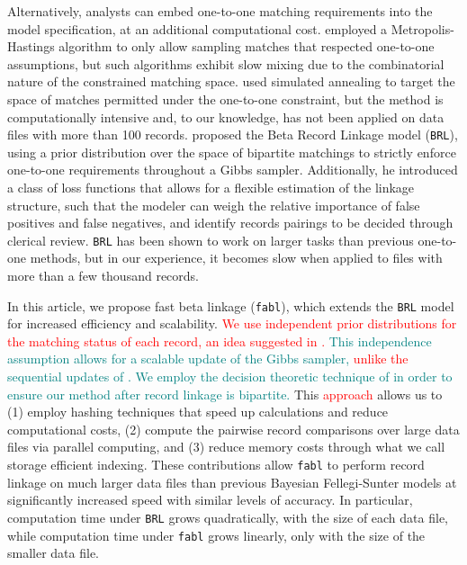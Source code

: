 \documentclass[ba]{imsart}
\begin{document}
Alternatively, analysts can embed one-to-one matching requirements into the model specification, at an additional computational cost. \cite{Larsen05} employed a Metropolis-Hastings algorithm to only allow sampling matches that respected one-to-one assumptions, but such algorithms exhibit slow mixing due to the combinatorial nature of the constrained matching space. \cite{fortunato_2010} used simulated annealing to target the space of matches permitted under the one-to-one constraint, but the method is computationally intensive and, to our knowledge, has not been applied on data files with more than 100 records. \cite{sadinle_bayesian_2017} proposed the Beta Record Linkage model (\texttt{BRL}), using a prior distribution over the space of bipartite matchings to strictly enforce one-to-one requirements throughout a Gibbs sampler. Additionally, he introduced a class of loss functions that allows for a flexible estimation of the linkage structure, such that the modeler can weigh the relative importance of false positives and false negatives, and identify records pairings to be decided through clerical review. \texttt{BRL} has been shown to work on larger tasks than previous one-to-one methods, but in our experience, it becomes slow when applied to files with more than a few thousand records. 

In this article, we propose fast beta linkage (\texttt{fabl}), which extends the \texttt{BRL} model for increased efficiency and scalability. 
\textcolor{red}{We use independent prior distributions for the matching status of each record, an idea suggested in \cite{wortman2019}.}
%
\textcolor{teal}{This independence assumption allows for a scalable update of the Gibbs sampler, \textcolor{red}{unlike the} sequential updates of \cite{sadinle_bayesian_2017}. We employ the decision theoretic technique of \cite{sadinle_bayesian_2017} in order to ensure our method after record linkage is bipartite.}
This \textcolor{red}{approach} allows us to (1) employ hashing techniques that speed up calculations and reduce computational costs, (2) compute the pairwise record comparisons over large data files via parallel computing, and (3) reduce memory costs through what we call storage efficient indexing. These contributions allow \texttt{fabl} to perform record linkage on much larger data files than previous Bayesian Fellegi-Sunter models at significantly increased speed with similar levels of accuracy. In particular, computation time under \texttt{BRL} grows quadratically, with the size of each data file, while computation time under \texttt{fabl} grows linearly, only with the size of the smaller data file.
\end{document}
